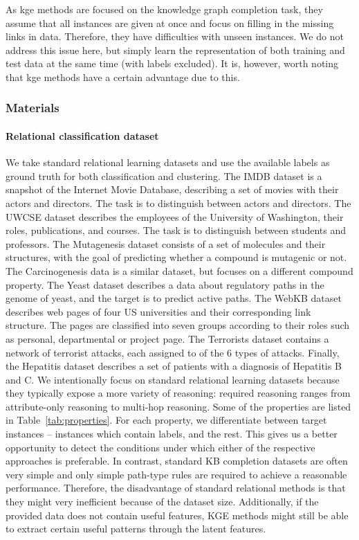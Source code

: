 As \gls{kge} methods are focused on the knowledge graph completion task, they assume that all instances are given at once and focus on filling in the missing links in data.
Therefore, they have difficulties with unseen instances.
We do not address this issue here, but simply learn the representation of both training and test data at the same time (with labels excluded).
It is, however, worth noting that \gls{kge} methods have a certain advantage due to this.




\subsubsection{Materials}



\paragraph{Relational classification dataset}
We take standard relational learning datasets and use the available labels as ground truth for both classification and clustering.
The IMDB dataset is a snapshot of the Internet Movie Database, describing a set of movies with their actors and directors.
The task is to distinguish between actors and directors.
The UWCSE dataset describes the employees of the University of Washington, their roles, publications, and courses.
The task is to distinguish between students and professors.
The Mutagenesis dataset consists of a set of molecules and their structures, with the goal of predicting whether a compound is mutagenic or not.
The Carcinogenesis data is a similar dataset, but focuses on a different compound property.
The Yeast dataset describes a data about regulatory paths in the genome of yeast, and the target is to predict active paths.
The WebKB dataset describes web pages of four US universities and their corresponding link structure.
The pages are classified into seven groups according to their roles such as personal, departmental or project page.
The Terrorists dataset contains a network of terrorist attacks, each assigned to of the 6 types of attacks.
Finally, the Hepatitis dataset describes a set of patients with a diagnosis of Hepatitis B and C.
We intentionally focus on standard relational learning datasets because they typically expose a more variety of reasoning: required reasoning ranges from attribute-only reasoning to multi-hop reasoning.
Some of the properties are listed in Table~\ref{tab:properties}.
For each property, we differentiate between target instances -- instances which contain labels, and the rest.
This gives us a better opportunity to detect the conditions under which either of the respective approaches is preferable.
In contrast, standard KB completion datasets are often very simple and  only simple path-type rules are required to achieve a reasonable performance.
Therefore, the disadvantage of standard relational methods is that they might very inefficient because of the dataset size.
Additionally, if the provided data does not contain useful features, KGE methods might still be able to extract certain useful patterns through the latent features.




